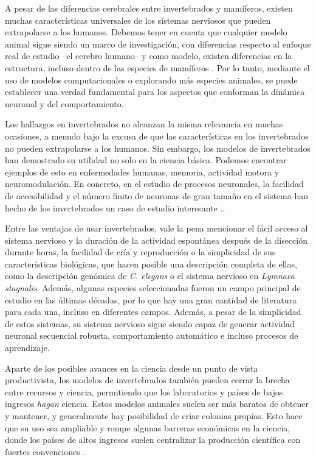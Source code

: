 A pesar de las diferencias cerebrales entre invertebrados y mamíferos, existen muchas características universales de los sistemas nerviosos que pueden extrapolarse a los humanos. Debemos tener en cuenta que cualquier modelo animal sigue siendo un marco de investigación, con diferencias respecto al enfoque real de estudio --el cerebro humano-- y como modelo, existen diferencias en la estructura, incluso dentro de las especies de mamíferos \parencite{preuss_taking_2000}. Por lo tanto, mediante el uso de modelos computacionales o explorando más especies animales, se puede establecer una verdad fundamental para los aspectos que conforman la dinámica neuronal y del comportamiento.

Los hallazgos en invertebrados no alcanzan la misma relevancia en muchas ocasiones, a menudo bajo la excusa de que las características en los invertebrados no pueden extrapolarse a los humanos. Sin embargo, los modelos de invertebrados han demostrado su utilidad no solo en la ciencia básica. Podemos encontrar ejemplos de esto en enfermedades humanas, memoria, actividad motora y neuromodulación. En concreto, en el estudio de procesos neuronales, la facilidad de accesibilidad y el número finito de neuronas de gran tamaño en el sistema han hecho de los invertebrados un caso de estudio interesante \parencite{gelperin_recent_2019}..

Entre las ventajas de usar invertebrados, vale la pena mencionar el fácil acceso al sistema nervioso y la duración de la actividad espontánea después de la disección durante horas, la facilidad de cría y reproducción o la simplicidad de sus características biológicas, que hacen posible una descripción completa de ellas, como la descripción genómica de \textit{C. elegans} o el sistema nervioso en \textit{Lymnaea stagnalis}. Además, algunas especies seleccionadas fueron un campo principal de estudio en las últimas décadas, por lo que hay una gran cantidad de literatura para cada una, incluso en diferentes campos. Además, a pesar de la simplicidad de estos sistemas, su sistema nervioso sigue siendo capaz de generar actividad neuronal secuencial robusta, comportamiento automático e incluso procesos de aprendizaje.

Aparte de los posibles avances en la ciencia desde un punto de vista productivista, los modelos de invertebrados también pueden cerrar la brecha entre recursos y ciencia, permitiendo que los laboratorios y países de bajos ingresos \textit{hagan} ciencia. Estos modelos animales suelen ser más baratos de obtener y mantener, y generalmente hay posibilidad de criar colonias propias. Esto hace que su uso sea ampliable y rompe algunas barreras económicas en la ciencia, donde los países de altos ingresos suelen centralizar la producción científica con fuertes convenciones \parencite{castillo_spineless_2017,stephan_how_2015}.


